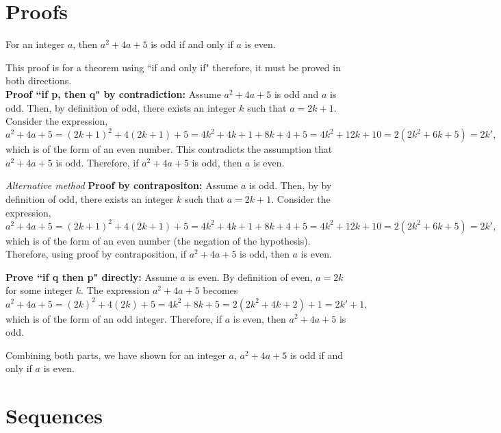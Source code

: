 \begin{questions}


\section*{Proofs}




 For an integer $a$, then $a^2 + 4a + 5$ is odd if and only if  $a$ is even. 
    \ifprintanswers
        \vspace{-10pt}
    \fi
\begin{solution}
     This proof is for a theorem using ``if and only if" therefore,
     it must be proved in both directions.  \\
    \textbf{Proof ``if p, then q" by contradiction:} Assume $a^2 + 4a + 5$ is
    odd and $a$ is odd.  Then, by definition of odd, there exists an integer $k$ such that $a = 2k+1$.  Consider the expression, 
    \[ a^2 + 4a + 5 = (2k+1)^2 + 4(2k+1) + 5 = 4k^2 + 4k + 1 + 8k + 4 + 5 = 4k^2 + 12k + 10 = 2(2k^2 + 6k + 5) = 2k', \]
    which is of the form of an even number.  This contradicts the assumption that $a^2 + 4a + 5$ is odd.  Therefore, if $a^2 + 4a + 5$ is odd, then $a$ is even. 


    \textit{Alternative method}\textbf{ Proof by contrapositon:}  Assume $a$ is odd.  Then, by by definition of odd, there exists an integer $k$ such that $a = 2k+1$.  Consider the expression, 
    \[ a^2 + 4a + 5 = (2k+1)^2 + 4(2k+1) + 5 = 4k^2 + 4k + 1 + 8k + 4 + 5 = 4k^2 + 12k + 10 = 2(2k^2 + 6k + 5) = 2k', \]
    which is of the form of an even number (the negation of the hypothesis).  Therefore, using proof by contraposition, if $a^2 + 4a + 5$ is odd, then $a$ is even.  

    \smallskip
    \textbf{Prove ``if q then p" directly:} Assume $a$ is even.  By definition of even, $a = 2k$ for some integer $k$.  The expression $a^2 + 4a + 5$ becomes 
    \[ a^2 + 4a + 5 = (2k)^2 + 4(2k) + 5 = 4k^2 + 8k + 5 = 2(2k^2 + 4k + 2) + 1 = 2k' + 1, \]
    which is of the form of an odd integer.  Therefore, if $a$ is even, then $a^2 + 4a + 5$ is odd. 

    \smallskip
    Combining both parts, we have shown for an integer $a$, $a^2 + 4a + 5$ is odd if and only if  $a$ is even. 
\end{solution}


\vspace{-20pt}
\section*{Sequences}



\end{questions}

